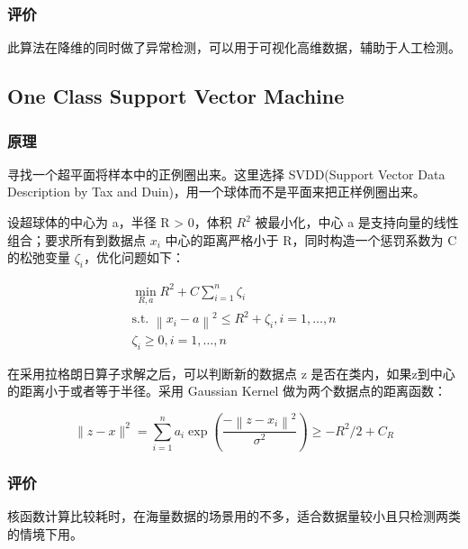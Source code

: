 \documentclass[UTF8]{ctexart}
\begin{document}
        \subsubsection{评价}
        此算法在降维的同时做了异常检测，可以用于可视化高维数据，辅助于人工检测。

    \subsection{One Class Support Vector Machine}
        \subsubsection{原理}
            寻找一个超平面将样本中的正例圈出来。这里选择 SVDD(Support Vector Data Description by Tax and Duin)，用一个球体而不是平面来把正样例圈出来。
            
            设超球体的中心为 a，半径 R > 0，体积 \( R^{2} \) 被最小化，中心 a 是支持向量的线性组合；要求所有到数据点 \( x_{i}\) 中心的距离严格小于 R，同时构造一个惩罚系数为 C 的松弛变量 \( \zeta_{i}\)，优化问题如下：

            $$
            \begin{array}{c}
            \min _{R, a} R^{2}+C \sum_{i=1}^{n} \zeta_{i} \\
            \text {s.t. }\left\|x_{i}-a\right\|^{2} \leq R^{2}+\zeta_{i}, i=1, \ldots, n \\
            \zeta_{i} \geq 0, i=1, \ldots, n
            \end{array}
            $$

            在采用拉格朗日算子求解之后，可以判断新的数据点 z 是否在类内，如果z到中心的距离小于或者等于半径。采用 Gaussian Kernel 做为两个数据点的距离函数：
            
            $$
            \|z-x\|^{2}=\sum_{i=1}^{n} a_{i} \exp \left(\frac{-\left\|z-x_{i}\right\|^{2}}{\sigma^{2}}\right) \geq-R^{2} / 2+C_{R}
            $$
            \cite{link9}
        \subsubsection{评价}
            核函数计算比较耗时，在海量数据的场景用的不多，适合数据量较小且只检测两类的情境下用。
\end{document}
